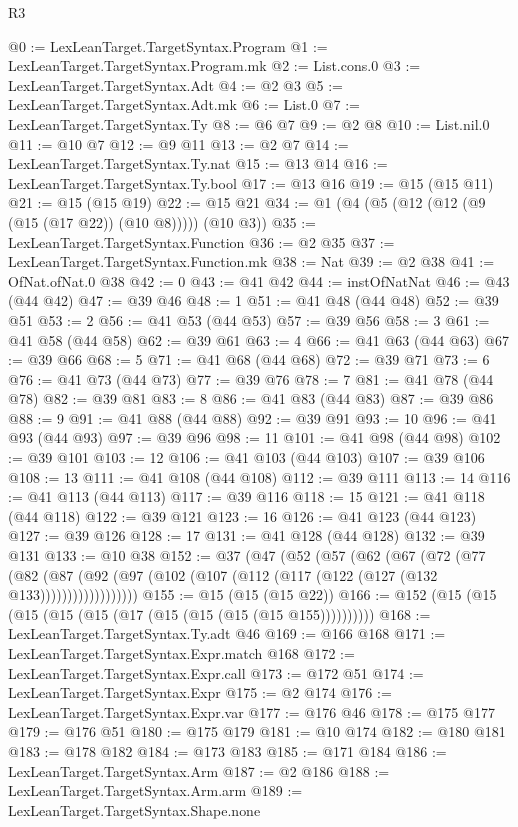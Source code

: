 \begin{lexlean}{R3}
\begin{coremodule}
@0 := LexLeanTarget.TargetSyntax.Program
@1 := LexLeanTarget.TargetSyntax.Program.mk
@2 := List.cons.{0}
@3 := LexLeanTarget.TargetSyntax.Adt
@4 := @2 @3
@5 := LexLeanTarget.TargetSyntax.Adt.mk
@6 := List.{0}
@7 := LexLeanTarget.TargetSyntax.Ty
@8 := @6 @7
@9 := @2 @8
@10 := List.nil.{0}
@11 := @10 @7
@12 := @9 @11
@13 := @2 @7
@14 := LexLeanTarget.TargetSyntax.Ty.nat
@15 := @13 @14
@16 := LexLeanTarget.TargetSyntax.Ty.bool
@17 := @13 @16
@19 := @15 (@15 @11)
@21 := @15 (@15 @19)
@22 := @15 @21
@34 := @1 (@4 (@5 (@12 (@12 (@9 (@15 (@17 @22)) (@10 @8))))) (@10 @3))
@35 := LexLeanTarget.TargetSyntax.Function
@36 := @2 @35
@37 := LexLeanTarget.TargetSyntax.Function.mk
@38 := Nat
@39 := @2 @38
@41 := OfNat.ofNat.{0} @38
@42 := 0
@43 := @41 @42
@44 := instOfNatNat
@46 := @43 (@44 @42)
@47 := @39 @46
@48 := 1
@51 := @41 @48 (@44 @48)
@52 := @39 @51
@53 := 2
@56 := @41 @53 (@44 @53)
@57 := @39 @56
@58 := 3
@61 := @41 @58 (@44 @58)
@62 := @39 @61
@63 := 4
@66 := @41 @63 (@44 @63)
@67 := @39 @66
@68 := 5
@71 := @41 @68 (@44 @68)
@72 := @39 @71
@73 := 6
@76 := @41 @73 (@44 @73)
@77 := @39 @76
@78 := 7
@81 := @41 @78 (@44 @78)
@82 := @39 @81
@83 := 8
@86 := @41 @83 (@44 @83)
@87 := @39 @86
@88 := 9
@91 := @41 @88 (@44 @88)
@92 := @39 @91
@93 := 10
@96 := @41 @93 (@44 @93)
@97 := @39 @96
@98 := 11
@101 := @41 @98 (@44 @98)
@102 := @39 @101
@103 := 12
@106 := @41 @103 (@44 @103)
@107 := @39 @106
@108 := 13
@111 := @41 @108 (@44 @108)
@112 := @39 @111
@113 := 14
@116 := @41 @113 (@44 @113)
@117 := @39 @116
@118 := 15
@121 := @41 @118 (@44 @118)
@122 := @39 @121
@123 := 16
@126 := @41 @123 (@44 @123)
@127 := @39 @126
@128 := 17
@131 := @41 @128 (@44 @128)
@132 := @39 @131
@133 := @10 @38
@152 := @37
    (@47
      (@52
        (@57
          (@62
            (@67
              (@72
                (@77
                  (@82
                    (@87 (@92 (@97 (@102 (@107 (@112 (@117 (@122 (@127 (@132 @133))))))))))))))))))
@155 := @15 (@15 (@15 @22))
@166 := @152 (@15 (@15 (@15 (@15 (@15 (@17 (@15 (@15 (@15 (@15 @155))))))))))
@168 := LexLeanTarget.TargetSyntax.Ty.adt @46
@169 := @166 @168
@171 := LexLeanTarget.TargetSyntax.Expr.match @168
@172 := LexLeanTarget.TargetSyntax.Expr.call
@173 := @172 @51
@174 := LexLeanTarget.TargetSyntax.Expr
@175 := @2 @174
@176 := LexLeanTarget.TargetSyntax.Expr.var
@177 := @176 @46
@178 := @175 @177
@179 := @176 @51
@180 := @175 @179
@181 := @10 @174
@182 := @180 @181
@183 := @178 @182
@184 := @173 @183
@185 := @171 @184
@186 := LexLeanTarget.TargetSyntax.Arm
@187 := @2 @186
@188 := LexLeanTarget.TargetSyntax.Arm.arm
@189 := LexLeanTarget.TargetSyntax.Shape.none

\end{coremodule}
\end{lexlean}
